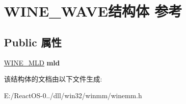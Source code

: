 \hypertarget{struct_w_i_n_e___w_a_v_e}{}\section{W\+I\+N\+E\+\_\+\+W\+A\+V\+E结构体 参考}
\label{struct_w_i_n_e___w_a_v_e}
\subsection*{Public 属性}
\begin{DoxyCompactItemize}
\item 
\mbox{\label{struct_w_i_n_e___w_a_v_e_aac4ef9729bf5f6ad14969033a48bee24}} 
\hyperlink{structtag_w_i_n_e___m_l_d}{W\+I\+N\+E\+\_\+\+M\+LD} {\bfseries mld}
\end{DoxyCompactItemize}


该结构体的文档由以下文件生成\+:\begin{DoxyCompactItemize}
\item 
E\+:/\+React\+O\+S-\/0../dll/win32/winmm/winemm.\+h\end{DoxyCompactItemize}
